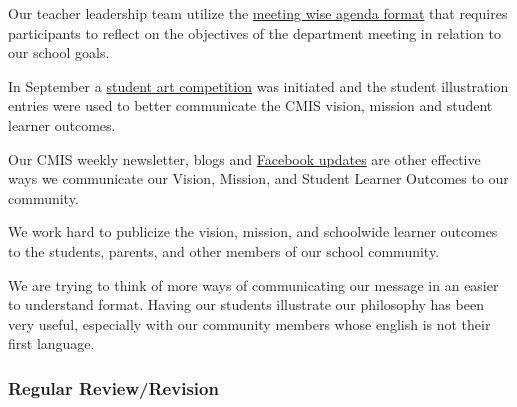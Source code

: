 \begin{findings}
Our teacher leadership team utilize the \href{https://drive.google.com/a/cmis.ac.th/file/d/0ByVFfrm0zfolT25VTjZZRzlXQjA/view?usp=sharing}{meeting wise agenda format} that requires participants to reflect on the objectives of the department meeting in relation to our 
school goals.

In September a \href{https://docs.google.com/a/cmis.ac.th/presentation/d/1bdi1LZUjWbGKOyB0XR9CGyoY2xLY39SZVKhiHTIJGxc/edit?usp=sharing}{student art competition} was initiated and the student illustration entries were used to better communicate the CMIS vision, mission and student learner outcomes.

Our CMIS weekly newsletter, blogs and \href{https://www.facebook.com/cmis.th/}{Facebook updates} are other effective ways we communicate our Vision, Mission, and Student Learner Outcomes to our community. 


We work hard to publicize the vision, mission, and schoolwide learner outcomes to the students, parents, and other members of our school community.

We are trying to think of more ways of communicating our message in an easier to understand format. Having our students illustrate our philosophy has been very useful, especially with our community members whose english is not their first language.
\end{findings}

\subsubsection{Regular Review/Revision}



